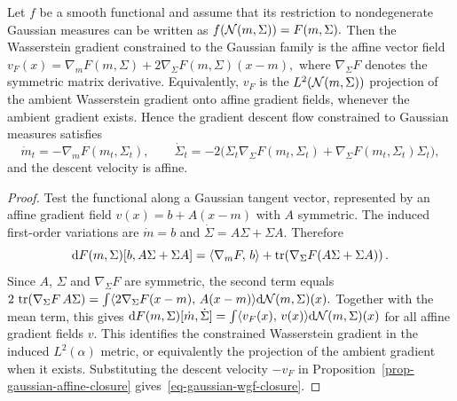 \begin{prop}\label{prop-gaussian-gradient-bullet-list}
Let $f$ be a smooth functional and assume that its restriction to nondegenerate Gaussian measures can be written as \(f(\mathcal{N}(m,\Sigma))=F(m,\Sigma).\)
Then the Wasserstein gradient constrained to the Gaussian family is the affine vector field
\(v_F(x) = \nabla_m F(m,\Sigma) + 2\nabla_\Sigma F(m,\Sigma)(x-m),\)
where $\nabla_\Sigma F$ denotes the symmetric matrix derivative. Equivalently, $v_F$ is the $L^2(\mathcal{N}(m,\Sigma))$ projection of the ambient Wasserstein gradient onto affine gradient fields, whenever the ambient gradient exists. Hence the gradient descent flow constrained to Gaussian measures satisfies
\begin{equation}\label{eq-gaussian-wgf-closure}
\dot m_t=-\nabla_m F(m_t,\Sigma_t),
\qquad
\dot\Sigma_t=-2\bigl(\Sigma_t\nabla_\Sigma F(m_t,\Sigma_t)+\nabla_\Sigma F(m_t,\Sigma_t)\Sigma_t\bigr),
\end{equation}
and the descent velocity is affine.
\end{prop}
\begin{proof}
Test the functional along a Gaussian tangent vector, represented by an affine gradient field
\(v(x)=b+A(x-m)\)
with $A$ symmetric. The induced first-order variations are $\dot m=b$ and $\dot\Sigma=A\Sigma+\Sigma A$. Therefore
\[
\mathrm{d} F(m,\Sigma)[b,A\Sigma+\Sigma A]
=
\langle \nabla_m F,\,b\rangle
+
\operatorname{tr}\!\left(\nabla_\Sigma F(A\Sigma+\Sigma A)\right).
\]
Since $A$, $\Sigma$ and $\nabla_\Sigma F$ are symmetric, the second term equals
\(2\,\operatorname{tr}(\nabla_\Sigma F\,A\Sigma) = \int \langle 2\nabla_\Sigma F(x-m),\,A(x-m)\rangle\mathrm{d}\mathcal{N}(m,\Sigma)(x).\)
Together with the mean term, this gives \(\mathrm{d} F(m,\Sigma)[\dot m,\dot\Sigma] = \int \langle v_F(x),\,v(x)\rangle\mathrm{d}\mathcal{N}(m,\Sigma)(x)\)
for all affine gradient fields $v$. This identifies the constrained Wasserstein gradient in the induced $L^2(\alpha)$ metric, or equivalently the projection of the ambient gradient when it exists. Substituting the descent velocity $-v_F$ in Proposition~\ref{prop-gaussian-affine-closure} gives~\eqref{eq-gaussian-wgf-closure}.
\end{proof}
